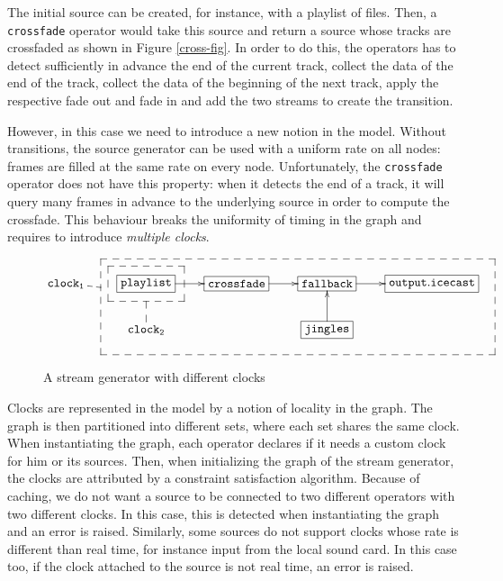 The initial source can be created, for instance, with a playlist of files. Then,
a \texttt{crossfade} operator would take this source and return a source whose tracks are 
crossfaded as shown in Figure \ref{cross-fig}. In order to do this, the operators has to 
detect sufficiently in advance the end of the current track, collect the data of the
end of the track, collect the data of the beginning of the next track, apply the respective
fade out and fade in and add the two streams to create the transition.

However, in this case we need to introduce a new notion in the model. Without transitions, the 
source generator can be used with a uniform rate on all nodes: frames are filled
at the same rate on every node. Unfortunately, the \texttt{crossfade} operator
does not have this property: when it detects the end of a track, it will query many frames in advance 
to the underlying source in order to compute the crossfade. This behaviour breaks the uniformity of 
timing in the graph and requires to introduce \textit{multiple clocks}.


\begin{figure}[b]
 \begin{center}
\[
\def\f{\save
*+<15pt>[F--]\frm{}\ar @{--} "2,2"\restore}%
\def\g{\save
"2,4"."1,2"."1,5"!C*+<27pt>[F--]\frm{}\ar @{--} "1,1"\restore}%
\xymatrix{
   \mathtt{clock_1} & *+[F]{\mathtt{playlist}}\ar[r]\f&*+[F]{\mathtt{crossfade}}\ar[r]&  *+[F]{\mathtt{fallback}}\ar[r]&
  *+[F]{\mathtt{output.icecast}}\\
   &\mathtt{clock_2} &  & *+[F]{\mathtt{jingles}}\ar[u]\g& 
}
\]
\end{center}
 \caption{A stream generator with different clocks}
\end{figure}

Clocks are represented in the model by a notion of locality in the graph. The graph is then partitioned into 
different sets, where each set shares the same clock.
When instantiating the graph, each operator declares if it needs a custom clock for him or its sources. 
Then, when initializing the graph of the stream generator, the clocks are attributed by a constraint 
satisfaction algorithm. Because of caching, we do not want a source to be connected to two different operators with 
two different clocks. In this case, this is detected when instantiating the graph and an error is raised.
Similarly, some sources do not support clocks whose rate is different than real time, for instance input 
from the local sound card. In this case too, if the clock attached to the source is not real time, an error
is raised.

